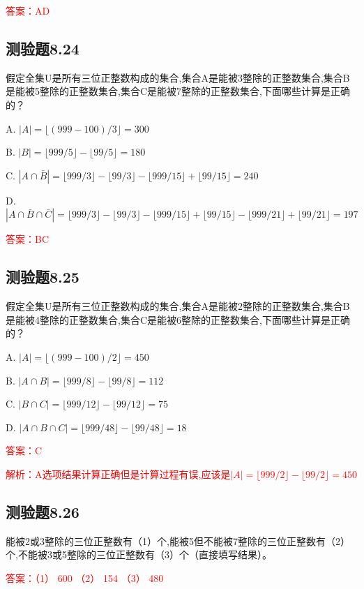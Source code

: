 \documentclass[UTF8, heading=true]{ctexart}
\begin{document}
\textcolor{red}{答案：AD}

\subsection{测验题8.24}
假定全集U是所有三位正整数构成的集合,集合A是能被3整除的正整数集合,集合B是能被5整除的正整数集合,集合C是能被7整除的正整数集合,下面哪些计算是正确的？

A. $|A|=\lfloor(999-100) / 3\rfloor=300$

B. $|B|=\lfloor 999 / 5\rfloor-\lfloor 99 / 5\rfloor=180$

C. $|A \cap \bar{B}|=\lfloor 999 / 3\rfloor-\lfloor 99 / 3\rfloor-\lfloor 999 / 15\rfloor+\lfloor 99 / 15\rfloor=240$

D. $|A \cap \bar{B} \cap \bar{C}|=\lfloor 999 / 3\rfloor-\lfloor 99 / 3\rfloor-\lfloor 999 / 15\rfloor+\lfloor 99 / 15\rfloor-\lfloor 999 / 21\rfloor+\lfloor 99 / 21\rfloor=197$

\textcolor{red}{答案：BC}

\subsection{测验题8.25}

假定全集U是所有三位正整数构成的集合,集合A是能被2整除的正整数集合,集合B是能被4整除的正整数集合,集合C是能被6整除的正整数集合,下面哪些计算是正确的？

A. $|A|=\lfloor(999-100) / 2\rfloor=450$

B. $|A \cap B|=\lfloor 999 / 8\rfloor-\lfloor 99 / 8\rfloor=112$

C. $|B \cap C|=\lfloor 999 / 12\rfloor-\lfloor 99 / 12\rfloor=75$

D. $|A \cap B \cap C|=\lfloor 999 / 48\rfloor-\lfloor 99 / 48\rfloor=18$

\textcolor{red}{答案：C}

\textcolor{red}{解析：A选项结果计算正确但是计算过程有误,应该是$|A|=\lfloor 999 / 2\rfloor - \lfloor 99 / 2\rfloor=450$}

\subsection{测验题8.26}


能被2或3整除的三位正整数有（1）个,能被5但不能被7整除的三位正整数有（2）个,不能被3或5整除的三位正整数有（3）个（直接填写结果）。

\textcolor{red}{答案：（1） 600 （2） 154 （3） 480}
\end{document}

